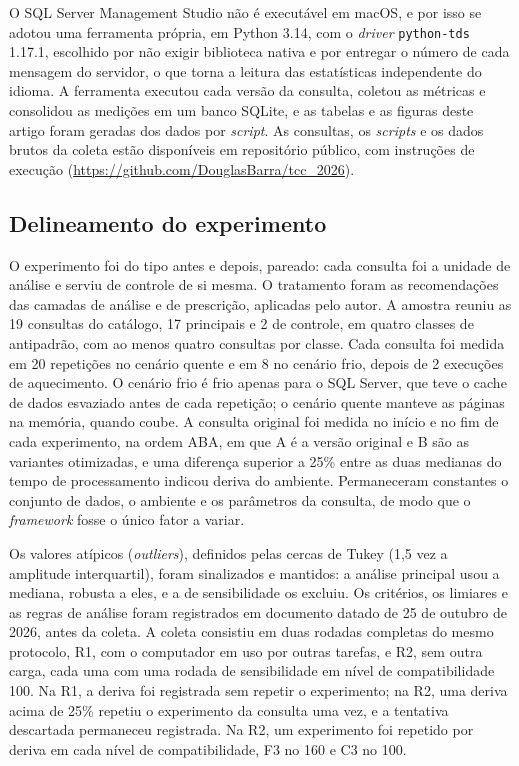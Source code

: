 O SQL Server Management Studio não é executável em macOS, e por isso se adotou uma ferramenta própria, em Python 3.14, com o \textit{driver} \texttt{python-tds} 1.17.1, escolhido por não exigir biblioteca nativa e por entregar o número de cada mensagem do servidor, o que torna a leitura das estatísticas independente do idioma. A ferramenta executou cada versão da consulta, coletou as métricas e consolidou as medições em um banco SQLite, e as tabelas e as figuras deste artigo foram geradas dos dados por \textit{script}. As consultas, os \textit{scripts} e os dados brutos da coleta estão disponíveis em repositório público, com instruções de execução (\url{https://github.com/DouglasBarra/tcc_2026}). 

\subsection{Delineamento do experimento}\label{sec:delineamento}

O experimento foi do tipo antes e depois, pareado: cada consulta foi a unidade de análise e serviu de controle de si mesma. O tratamento foram as recomendações das camadas de análise e de prescrição, aplicadas pelo autor. A amostra reuniu as 19 consultas do catálogo, 17 principais e 2 de controle, em quatro classes de antipadrão, com ao menos quatro consultas por classe. Cada consulta foi medida em 20 repetições no cenário quente e em 8 no cenário frio, depois de 2 execuções de aquecimento. O cenário frio é frio apenas para o SQL Server, que teve o cache de dados esvaziado antes de cada repetição; o cenário quente manteve as páginas na memória, quando coube. A consulta original foi medida no início e no fim de cada experimento, na ordem ABA, em que A é a versão original e B são as variantes otimizadas, e uma diferença superior a 25\% entre as duas medianas do tempo de processamento indicou deriva do ambiente. Permaneceram constantes o conjunto de dados, o ambiente e os parâmetros da consulta, de modo que o \textit{framework} fosse o único fator a variar.

Os valores atípicos (\textit{outliers}), definidos pelas cercas de Tukey (1,5 vez a amplitude interquartil), foram sinalizados e mantidos: a análise principal usou a mediana, robusta a eles, e a de sensibilidade os excluiu. Os critérios, os limiares e as regras de análise foram registrados em documento datado de 25 de outubro de 2026, antes da coleta. A coleta consistiu em duas rodadas completas do mesmo protocolo, R1, com o computador em uso por outras tarefas, e R2, sem outra carga, cada uma com uma rodada de sensibilidade em nível de compatibilidade 100. Na R1, a deriva foi registrada sem repetir o experimento; na R2, uma deriva acima de 25\% repetiu o experimento da consulta uma vez, e a tentativa descartada permaneceu registrada. Na R2, um experimento foi repetido por deriva em cada nível de compatibilidade, F3 no 160 e C3 no 100.

